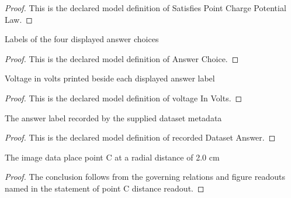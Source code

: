 \begin{proof}
  This is the declared model definition of Satisfies Point Charge Potential Law.
\end{proof}
\begin{definition}
  \label{def:physics:phyx-mini-0857:phyxminiproblems-problemphyxmini0857-answerchoice}
  Labels of the four displayed answer choices
\end{definition}
\begin{proof}
  This is the declared model definition of Answer Choice.
\end{proof}
\begin{definition}
  \label{def:physics:phyx-mini-0857:phyxminiproblems-problemphyxmini0857-answerchoice-voltageinvolts}
  Voltage in volts printed beside each displayed answer label
\end{definition}
\begin{proof}
  This is the declared model definition of voltage In Volts.
\end{proof}
\begin{definition}
  \label{def:physics:phyx-mini-0857:phyxminiproblems-problemphyxmini0857-recordeddatasetanswer}
  The answer label recorded by the supplied dataset metadata
\end{definition}
\begin{proof}
  This is the declared model definition of recorded Dataset Answer.
\end{proof}
\begin{lemma}
  \label{lem:physics:phyx-mini-0857:phyxminiproblems-problemphyxmini0857-pointc-distance-readout}
  The image data place point C at a radial distance of 2.0 cm
\end{lemma}
\begin{proof}
  The conclusion follows from the governing relations and figure readouts named in the statement of point C distance readout.
\end{proof}
